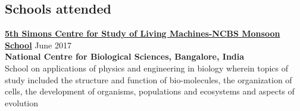 \documentclass[margin, centered, 11pt]{res}
\begin{document}
\begin{resume}
\section{Schools attended} %
 \textbf{\href{https://theory.ncbs.res.in/physlife}{5th Simons Centre for Study of Living Machines-NCBS Monsoon School}} \hfill{June 2017}\\
\textbf{National Centre for Biological Sciences, Bangalore, India}\\
School on applications of physics and engineering in biology wherein topics of study included the structure and function of bio-molecules, the organization of cells, the development of organisms, populations and ecosystems and aspects of evolution 









\end{resume}
\end{document}
